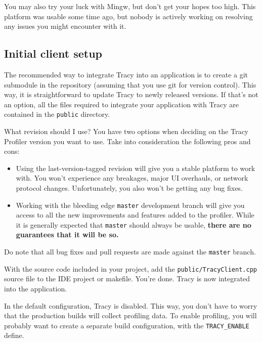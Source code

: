 \documentclass[hidelinks,titlepage,a4paper]{article}
\begin{document}
You may also try your luck with Mingw, but don't get your hopes too high. This platform was usable some time ago, but nobody is actively working on resolving any issues you might encounter with it.

\subsection{Initial client setup}
\label{initialsetup}

The recommended way to integrate Tracy into an application is to create a git submodule in the repository (assuming that you use git for version control). This way, it is straightforward to update Tracy to newly released versions. If that's not an option, all the files required to integrate your application with Tracy are contained in the \texttt{public} directory.

\begin{bclogo}[
noborder=true,
couleur=black!5,
logo=\bclampe
]{What revision should I use?}
You have two options when deciding on the Tracy Profiler version you want to use. Take into consideration the following pros and cons:

\begin{itemize}
\item Using the last-version-tagged revision will give you a stable platform to work with. You won't experience any breakages, major UI overhauls, or network protocol changes. Unfortunately, you also won't be getting any bug fixes.
\item Working with the bleeding edge \texttt{master} development branch will give you access to all the new improvements and features added to the profiler. While it is generally expected that \texttt{master} should always be usable, \textbf{there are no guarantees that it will be so.}
\end{itemize}

Do note that all bug fixes and pull requests are made against the \texttt{master} branch.
\end{bclogo}

With the source code included in your project, add the \texttt{public/TracyClient.cpp} source file to the IDE project or makefile. You're done. Tracy is now integrated into the application.

In the default configuration, Tracy is disabled. This way, you don't have to worry that the production builds will collect profiling data. To enable profiling, you will probably want to create a separate build configuration, with the \texttt{TRACY\_ENABLE} define.
\end{document}
